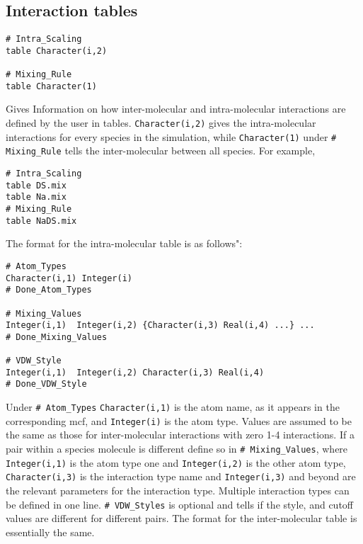 \documentclass[12pt,twoside]{article}
\begin{document}
\subsection{Interaction tables}
\begin{verbatim}
# Intra_Scaling
table Character(i,2)

# Mixing_Rule
table Character(1)
\end{verbatim}
Gives Information on how inter-molecular and intra-molecular interactions are defined by the user in tables.  \texttt{Character(i,2)} gives the intra-molecular interactions for every species in the simulation, while \texttt{Character(1)} under  \texttt{\# Mixing\_Rule} tells the inter-molecular between all species.
\newline\noindent For example,
\begin{verbatim}
# Intra_Scaling
table DS.mix
table Na.mix
# Mixing_Rule
table NaDS.mix
\end{verbatim}
The format for the intra-molecular table is as follows":
\begin{verbatim}
# Atom_Types
Character(i,1) Integer(i)
# Done_Atom_Types

# Mixing_Values
Integer(i,1)  Integer(i,2) {Character(i,3) Real(i,4) ...} ...
# Done_Mixing_Values

# VDW_Style
Integer(i,1)  Integer(i,2) Character(i,3) Real(i,4)
# Done_VDW_Style
\end{verbatim}
Under \texttt{\# Atom\_Types} \texttt{Character(i,1)} is the atom name, as it appears in the corresponding mcf, and  \texttt{Integer(i)} is the atom type.  Values are assumed to be the same as those for inter-molecular interactions with zero 1-4 interactions.  If a pair within a species molecule is different define so in \texttt{\# Mixing\_Values}, where \texttt{Integer(i,1)} is the atom type one and \texttt{Integer(i,2)} is the other atom type, \texttt{Character(i,3)} is the interaction type name and \texttt{Integer(i,3)} and beyond are the relevant parameters for the interaction type.  Multiple interaction types can be defined in one line. \texttt{\# VDW\_Styles} is optional and tells if the style, and cutoff values are different for different pairs.
\newline\noindent The format for the inter-molecular table is essentially the same.
\end{document}
